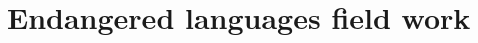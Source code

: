 \documentclass[11pt]{article}
\newcommand{\smalltodo}[2][]
    {\todo[caption={#2}, #1]
    {\tiny#2\normalsize}}
\begin{document}
%




\section{Endangered languages field work}\label{sec:field work}
\end{document}
